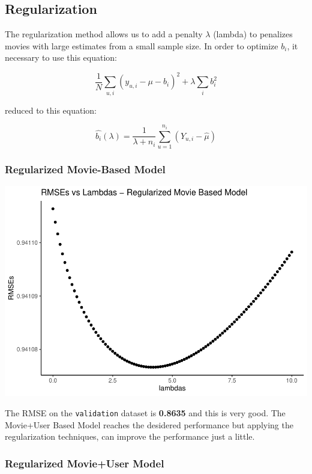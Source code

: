\documentclass[
]{article}
\begin{document}
\hypertarget{regularization}{%
\subsection{Regularization}\label{regularization}}

The regularization method allows us to add a penalty \(\lambda\)
(lambda) to penalizes movies with large estimates from a small sample
size. In order to optimize \(b_i\), it necessary to use this equation:

\[\frac{1}{N} \sum_{u,i} (y_{u,i} - \mu - b_{i})^{2} + \lambda \sum_{i} b_{i}^2\]

reduced to this equation:

\[\hat{b_{i}} (\lambda) = \frac{1}{\lambda + n_{i}} \sum_{u=1}^{n_{i}} (Y_{u,i} - \hat{\mu}) \]

\hypertarget{regularized-movie-based-model}{%
\subsubsection{Regularized Movie-Based
Model}\label{regularized-movie-based-model}}

\begin{center}\includegraphics{MovieLens-Project-Report_files/figure-latex/unnamed-chunk-37-1} \end{center}

The RMSE on the \texttt{validation} dataset is \textbf{0.8635} and this
is very good. The Movie+User Based Model reaches the desidered
performance but applying the regularization techniques, can improve the
performance just a little.

\hypertarget{regularized-movieuser-model}{%
\subsubsection{Regularized Movie+User
Model}\label{regularized-movieuser-model}}
\end{document}

